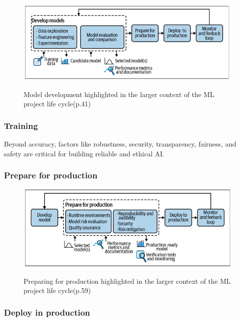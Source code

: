 \begin{figure}[!htbp]
    \caption{Model development highlighted in the larger context of the ML project life
    cycle\cite{treveil2020introducing}(p.41)}
    \centering
    \includegraphics[scale=0.5]{images/developing-models-intro}
    \label{fig:developing-models-intro}
\end{figure}

\subsubsection{Training}

Beyond accuracy, factors like robustness, security, transparency, fairness, and safety are critical for building reliable and ethical AI\cite{10.1145/3555803}.

\subsubsection{Prepare for production}

\begin{figure}[!htbp]
    \caption{Preparing for production highlighted in the larger context of the ML project
    life cycle\cite{treveil2020introducing}(p.59)}
    \centering
    \includegraphics[scale=0.5]{images/prep-prod-intro}
    \label{fig:prep-prod-intro}
\end{figure}


\subsubsection{Deploy in production}


